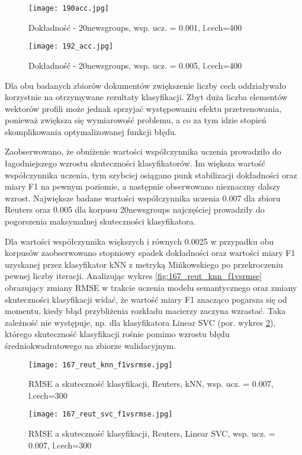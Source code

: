 \documentclass{pracamgr}
\begin{document}
\begin{figure}[]
  \texttt{[image: 190acc.jpg]}
  \caption{Dokładność - 20newsgroups, wsp. ucz. = 0.001, l.cech=400}\label{fig:190acc}
\endminipage\hfill
{}%
  \texttt{[image: 192\_acc.jpg]}
  \caption{Dokładność - 20newsgroups, wsp. ucz. = 0.005, l.cech=400}\label{fig:192acc}
\endminipage\hfill
\end{figure}

Dla obu badanych zbiorów dokumentów zwiększenie liczby cech oddziaływało korzystnie na otrzymywane rezultaty klasyfikacji. Zbyt duża liczba elementów wektorów profili może jednak sprzyjać występowaniu efektu przetrenowania, ponieważ zwiększa się wymiarowość problemu, a co za tym idzie stopień skomplikowania optymalizowanej funkcji błędu.

Zaobserwowano, że obniżenie wartości współczynnika uczenia prowadziło do łagodniejszego wzrostu skuteczności klasyfikatorów. Im większa wartość współczynnika uczenia, tym szybciej osiągano punk stabilizacji dokładności oraz miary F1 na pewnym poziomie, a następnie obserwowano nieznaczny dalszy wzrost. Największe badane wartości współczynnika uczenia 0.007 dla zbioru Reuters oraz 0.005 dla korpusu 20newsgroups najczęściej prowadziły do pogorszenia maksymalnej skuteczności klasyfikatora. 

Dla wartości współczynnika większych i równych 0.0025 w przypadku obu korpusów zaobserwowano stopniowy spadek dokładności oraz wartości miary F1 uzyskanej przez klasyfikator kNN z metryką Mińkowskiego po przekroczeniu pewnej liczby iteracji. Analizując wykres \ref{fig:167_reut_knn_f1vsrmse} obrazujący zmiany RMSE w trakcie uczenia modelu semantycznego oraz zmiany skuteczności klasyfikacji widać, że wartość miary F1 znacząco pogarsza się od momentu, kiedy błąd przybliżenia rozkładu macierzy zaczyna wzrastać. Taka zależność nie występuje, np. dla klasyfikatora Linear SVC (por. wykres \ref{fig:167_reut_svc_f1vsrmse}), którego skuteczność klasyfikacji rośnie pomimo wzrostu błędu średniokwadratowego na zbiorze walidacyjnym. 

\begin{figure}[]
  \texttt{[image: 167\_reut\_knn\_f1vsrmse.jpg]}
  \caption{RMSE a skuteczność klasyfikacji, Reuters, kNN, wsp. ucz. = 0.007, l.cech=300}\label{fig:167_reut_knn_f1vsrmse}
\endminipage\hfill
{}%
  \texttt{[image: 167\_reut\_svc\_f1vsrmse.jpg]}
  \caption{RMSE a skuteczność klasyfikacji, Reuters, Linear SVC, wsp. ucz. = 0.007, l.cech=300}\label{fig:167_reut_svc_f1vsrmse}
\endminipage\hfill
\end{figure}
\end{document}
